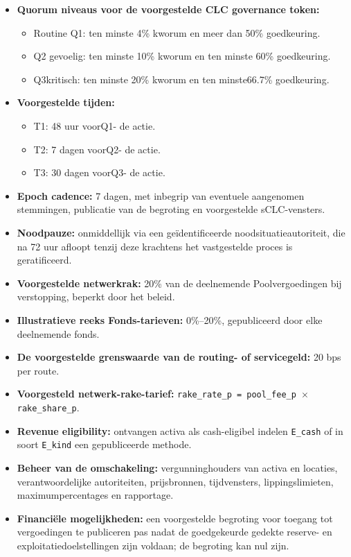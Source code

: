 \documentclass[11pt]{article}
\begin{document}
\begin{itemize}[leftmargin=*]
\item \textbf{Quorum niveaus voor de voorgestelde CLC governance token:}
\begin{itemize}[leftmargin=*]
\item Routine Q1: ten minste 4\% kworum en meer dan 50\% goedkeuring.
\item Q2 gevoelig: ten minste 10\% kworum en ten minste 60\% goedkeuring.
\item Q3kritisch: ten minste 20\% kworum en ten minste66.7\% goedkeuring.
\end{itemize}
\item \textbf{Voorgestelde tijden:}
\begin{itemize}[leftmargin=*]
\item T1: 48 uur voorQ1- de actie.
\item T2: 7 dagen voorQ2- de actie.
\item T3: 30 dagen voorQ3- de actie.
\end{itemize}
\item \textbf{Epoch cadence:} 7 dagen, met inbegrip van eventuele aangenomen stemmingen, publicatie van de begroting en voorgestelde sCLC-vensters.
\item \textbf{Noodpauze:} onmiddellijk via een geïdentificeerde noodsituatieautoriteit, die na 72 uur afloopt tenzij deze krachtens het vastgestelde proces is geratificeerd.
\item \textbf{Voorgestelde netwerkrak:} 20\% van de deelnemende Poolvergoedingen bij verstopping, beperkt door het beleid.
\item \textbf{Illustratieve reeks Fonds-tarieven:} 0\%--20\%, gepubliceerd door elke deelnemende fonds.
\item \textbf{De voorgestelde grenswaarde van de routing- of servicegeld:} 20 bps per route.
\item \textbf{Voorgesteld netwerk-rake-tarief:} \texttt{rake\_rate\_p = pool\_fee\_p $\times$ rake\_share\_p}.
\item \textbf{Revenue eligibility:} ontvangen activa als cash-eligibel indelen \texttt{E\_cash} of in soort \texttt{E\_kind} een gepubliceerde methode.
\item \textbf{Beheer van de omschakeling:} vergunninghouders van activa en locaties, verantwoordelijke autoriteiten, prijsbronnen, tijdvensters, lippingslimieten, maximumpercentages en rapportage.
\item \textbf{Financiële mogelijkheden:} een voorgestelde begroting voor toegang tot vergoedingen te publiceren pas nadat de goedgekeurde gedekte reserve- en exploitatiedoelstellingen zijn voldaan; de begroting kan nul zijn.

\end{itemize}
\end{document}
